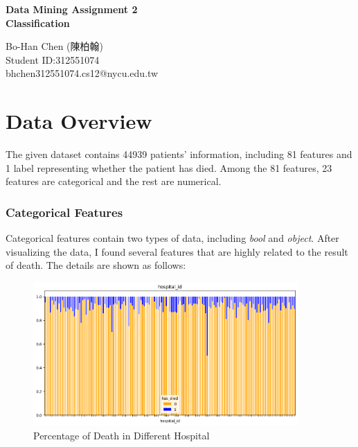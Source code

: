 \documentclass[a4paper, oneside, final, 12pt]{scrartcl} %
\begin{document}


\begin{center}
    {\fontsize{18}{30}\textbf{Data Mining Assignment 2 \\ Classification}}
\end{center}

\begin{center}
  Bo-Han Chen (陳柏翰) \\
  Student ID:312551074 \\
  bhchen312551074.cs12@nycu.edu.tw
\end{center}


\begingroup
\raggedright

\section{Data Overview}

The given dataset contains 44939 patients' information, including 81 features and 1 label representing whether the patient has died.
Among the 81 features, 23 features are categorical and the rest are numerical.

\subsubsection{Categorical Features}

Categorical features contain two types of data, including \emph{bool} and \emph{object}.
After visualizing the data, I found several features that are highly related to the result of death.
The details are shown as follows:

\begin{figure}[ht]
  \centering
  \includegraphics[width=0.9\textwidth]{"./image/dataset/hospital_id_dis.png"}
  \caption{Percentage of Death in Different Hospital}
  \label{fig:hospital}
\end{figure}
\end{document}

